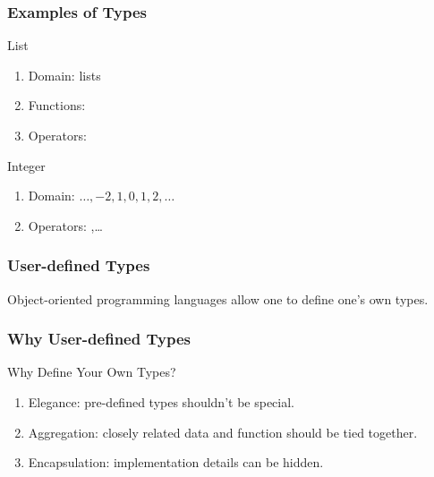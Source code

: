 \begin{frame}[fragile] 
\frametitle{Examples of Types}

\begin{block}{List}
\begin{enumerate}
\item Domain: lists
\item Functions: 
\item Operators: 
\end{enumerate}
\end{block}

\pause
\begin{block}{Integer}
\begin{enumerate}
\item Domain: $\dots,-2, 1, 0, 1, 2, \dots$
\item Operators: ,\ldots
\end{enumerate}
\end{block}
\end{frame}

\begin{frame}[fragile] 
\frametitle{User-defined Types}

Object-oriented programming languages allow one to define one's own types.

\end{frame}

\begin{frame}[fragile] 
\frametitle{Why User-defined Types}

\begin{block}{Why Define Your Own Types?}
\begin{enumerate}
\item Elegance: pre-defined types shouldn't be special.
\item Aggregation: closely related data and function should be tied together.
\item Encapsulation: implementation details can be hidden.
\end{enumerate}
\end{block}

\end{frame}


